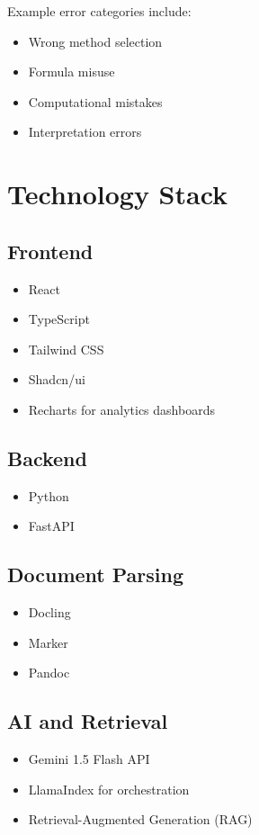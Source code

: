 \documentclass[11pt]{article}
\begin{document}
Example error categories include:

\begin{itemize}
\item Wrong method selection
\item Formula misuse
\item Computational mistakes
\item Interpretation errors
\end{itemize}

\section{Technology Stack}

\subsection{Frontend}
\begin{itemize}
\item React
\item TypeScript
\item Tailwind CSS
\item Shadcn/ui
\item Recharts for analytics dashboards
\end{itemize}

\subsection{Backend}
\begin{itemize}
\item Python
\item FastAPI
\end{itemize}

\subsection{Document Parsing}
\begin{itemize}
\item Docling
\item Marker
\item Pandoc
\end{itemize}

\subsection{AI and Retrieval}
\begin{itemize}
\item Gemini 1.5 Flash API
\item LlamaIndex for orchestration
\item Retrieval-Augmented Generation (RAG)
\end{itemize}
\end{document}
